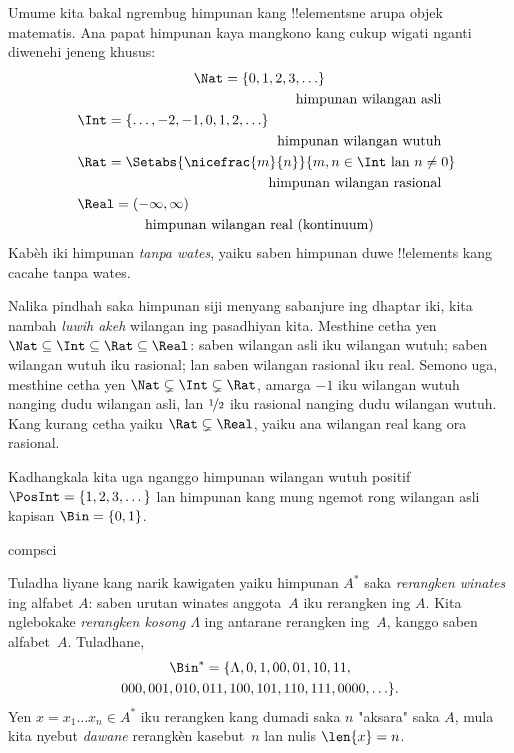 \documentclass[../../../include/open-logic-section]{subfiles}
\begin{document}

\begin{ex}
Umume kita bakal ngrembug himpunan kang !!{element}sne arupa
objek matematis. Ana papat himpunan kaya mangkono kang cukup
wigati nganti diwenehi jeneng khusus:
\begin{multline*}
    \Nat = \{0, 1, 2, 3, \ldots\} \\
    \shoveright{\text{himpunan wilangan asli}}\\
    \shoveleft{\Int = \{\ldots, -2, -1, 0, 1, 2, \ldots\}} \\
    \shoveright{\text{himpunan wilangan wutuh}}\\
    \shoveleft{\Rat = \Setabs{\nicefrac{m}{n}}{m, n \in \Int\text{ lan }n \neq 0}}\\
    \shoveright{\text{himpunan wilangan rasional}}\\
    \shoveleft{\Real = (-\infty, \infty)}\\
    \text{himpunan wilangan real (kontinuum)}
\end{multline*}
Kabèh iki himpunan \emph{tanpa wates}, yaiku saben himpunan
duwe !!{element}s kang cacahe tanpa wates.

Nalika pindhah saka himpunan siji menyang sabanjure ing dhaptar iki,
kita nambah \emph{luwih akeh} wilangan ing pasadhiyan kita.
Mesthine cetha yen $\Nat \subseteq \Int
\subseteq \Rat \subseteq \Real$: saben wilangan asli iku
wilangan wutuh; saben wilangan wutuh iku rasional; lan saben
wilangan rasional iku real. Semono uga, mesthine cetha yen
$\Nat \subsetneq \Int \subsetneq
\Rat$, amarga $-1$ iku wilangan wutuh nanging dudu wilangan asli,
lan $\nicefrac{1}{2}$ iku rasional nanging dudu wilangan wutuh.
Kang kurang cetha yaiku $\Rat \subsetneq \Real$, yaiku ana
wilangan real kang ora rasional.

Kadhangkala kita uga nganggo himpunan wilangan wutuh positif
$\PosInt = \{1,2, 3, \dots\}$ lan himpunan kang mung ngemot
rong wilangan asli kapisan $\Bin = \{0, 1\}$.
\end{ex}

\begin{tagblock}{compsci}
\begin{ex}[Rerangken]
Tuladha liyane kang narik kawigaten yaiku himpunan $A^{*}$ saka
\emph{rerangken winates} ing alfabet $A$: saben urutan winates
anggota~$A$ iku rerangken ing $A$. Kita nglebokake
\emph{rerangken kosong $\Lambda$} ing antarane rerangken ing~$A$,
kanggo saben alfabet~$A$. Tuladhane,
\begin{multline*}
\Bin^*
=\{\Lambda,0,1,00,01,10,11,\\
000,001,010,011,100,101,110,111,0000,\ldots\}.
\end{multline*}
Yen $x=x_{1}\ldots x_{n}\in A^{*}$ iku rerangken kang dumadi
saka $n$ "aksara" saka $A$, mula kita nyebut \emph{dawane}
rerangkèn kasebut~$n$ lan nulis $\len{x}=n$.
\end{ex}
\end{tagblock}
\end{document}
